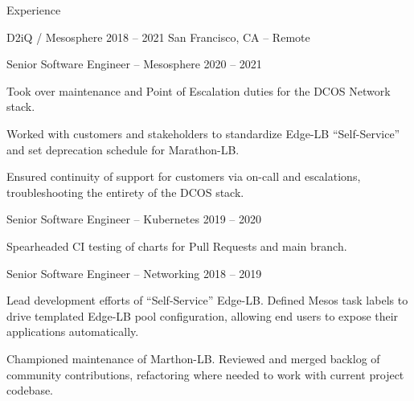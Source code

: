 \documentclass{resume}
\begin{document}
\begin{rSection}{Experience}
        \begin{rSubsection}{D2iQ / Mesosphere}
            {2018 -- 2021} %
            {San Francisco, CA -- Remote} %
            \begin{rSubsubsection}{Senior Software Engineer -- Mesosphere} %
                {2020 -- 2021} %
                {\small
            \item Took over maintenance and Point of Escalation duties for the DCOS
                Network stack.
            \item Worked with customers and stakeholders to standardize Edge-LB
                ``Self-Service'' and set deprecation schedule for Marathon-LB\@.
            \item Ensured continuity of support for customers via on-call and
                escalations, troubleshooting the entirety of the DCOS stack.
                }
            \end{rSubsubsection}
            \begin{rSubsubsection}{Senior Software Engineer -- Kubernetes} %
                {2019 -- 2020} %
                {\small
            \item Spearheaded CI testing of charts for Pull Requests and main branch.
                }
            \end{rSubsubsection}
            \begin{rSubsubsection}{Senior Software Engineer -- Networking} %
                {2018 -- 2019} %
                {\small
            \item Lead development efforts of ``Self-Service'' Edge-LB\@. Defined Mesos
                task labels to drive templated Edge-LB pool configuration, allowing
                end users to expose their applications automatically.
            \item Championed maintenance of Marthon-LB\@. Reviewed and merged backlog of
                community contributions, refactoring where needed to work with current
                project codebase.
                }
            \end{rSubsubsection}
        \end{rSubsection}


\end{rSection}
\end{document}
